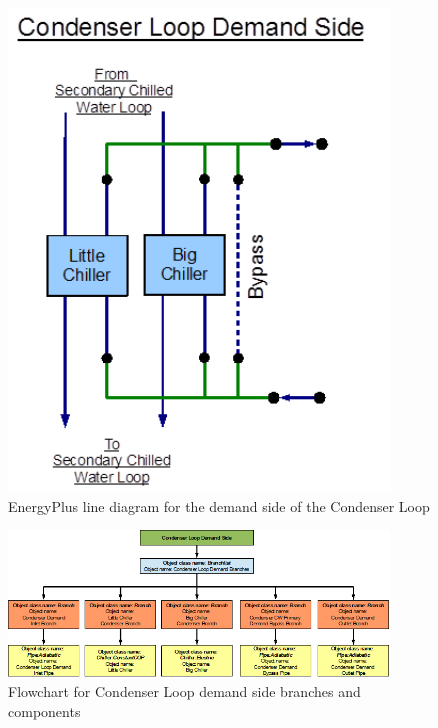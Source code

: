 \begin{figure}[hbtp] %
\centering
\includegraphics[width=0.9\textwidth, height=0.9\textheight, keepaspectratio=true]{media/image122.png}
\caption{EnergyPlus line diagram for the demand side of the Condenser Loop \protect \label{fig:energyplus-line-diagram-for-the-demand-side-002}}
\end{figure}

\begin{figure}[hbtp] %
\centering
\includegraphics[width=0.9\textwidth, height=0.9\textheight, keepaspectratio=true]{media/image123.png}
\caption{Flowchart for Condenser Loop demand side branches and components \protect \label{fig:flowchart-for-condenser-loop-demand-side-002}}
\end{figure}

